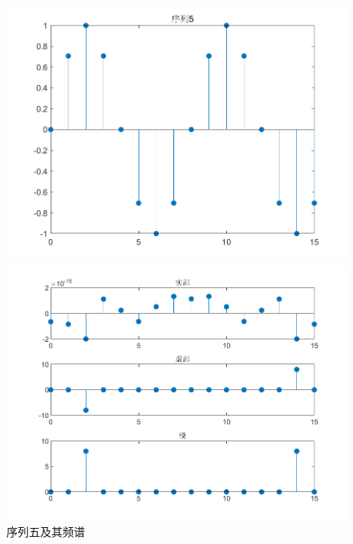 \documentclass{../source/zjureport}
\begin{document}
            \begin{figure}[H]
                \centering
                \begin{minipage}[t]{0.48\textwidth}
                \centering
                \includegraphics[width=\textwidth]{figure/序列5.png}
                \end{minipage}
                \begin{minipage}[t]{0.48\textwidth}
                \centering
                \includegraphics[width=\textwidth]{figure/频谱_序列5.png}
                \end{minipage}
                \caption{序列五及其频谱}
            \end{figure}
\end{document}

